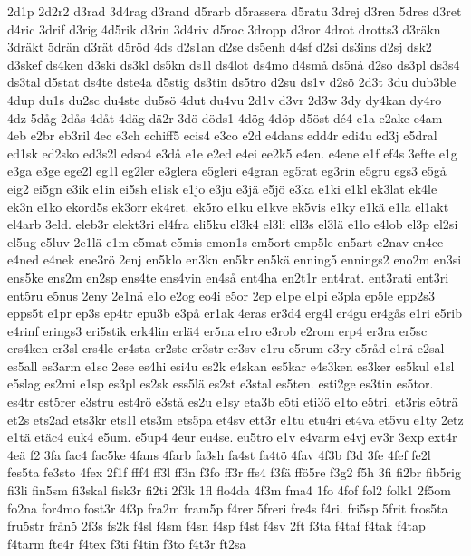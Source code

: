 {2d1p
2d2r2
d3rad
3d4rag
d3rand
d5rarb
d5rassera
d5ratu
3drej
d3ren
5dres
d3ret
d4ric
3drif
d3rig
4d5rik
d3rin
3d4riv
d5roc
3dropp
d3ror
4drot
drotts3
d3r^^e4kn
3dr^^e4kt
5dr^^e4n
d3r^^e4t
d5r^^f6d
4ds
d2s1an
d2se
ds5enh
d4sf
d2si
ds3ins
d2sj
dsk2
d3skef
ds4ken
d3ski
ds3kl
ds5kn
ds1l
ds4lot
ds4mo
d4sm^^e5
ds5n^^e5
d2so
ds3pl
ds3s4
ds3tal
d5stat
ds4te
dste4a
d5stig
ds3tin
ds5tro
d2su
ds1v
d2s^^f6
2d3t
3du
dub3ble
4dup
du1s
du2sc
du4ste
du5s^^f6
4dut
du4vu
2d1v
d3vr
2d3w
3dy
dy4kan
dy4ro
4dz
5d^^e5g
2d^^e5s
4d^^e5t
4d^^e4g
d^^e42r
3d^^f6
d^^f6ds1
4d^^f6g
4d^^f6p
d5^^f6st
d^^e94
e1a
e2ake
e4am
4eb
e2br
eb3ril
4ec
e3ch
echiff5
ecis4
e3co
e2d
e4dans
edd4r
edi4u
ed3j
e5dral
ed1sk
ed2sko
ed3s2l
edso4
e3d^^e5
e1e
e2ed
e4ei
ee2k5
e4en.
e4ene
e1f
ef4s
3efte
e1g
e3ga
e3ge
ege2l
eg1l
eg2ler
e3glera
e5gleri
e4gran
eg5rat
eg3rin
e5gru
egs3
e5g^^e5
eig2
ei5gn
e3ik
e1in
ei5sh
e1isk
e1jo
e3ju
e3j^^e4
e5j^^f6
e3ka
e1ki
e1kl
ek3lat
ek4le
ek3n
e1ko
ekord5s
ek3orr
ek4ret.
ek5ro
e1ku
e1kve
ek5vis
e1ky
e1k^^e4
e1la
el1akt
el4arb
3eld.
eleb3r
elekt3ri
el4fra
eli5ku
el3k4
el3li
ell3s
el3l^^e4
e1lo
e4lob
el3p
el2si
el5ug
e5luv
2e1l^^e4
e1m
e5mat
e5mis
emon1s
em5ort
emp5le
en5art
e2nav
en4ce
e4ned
e4nek
ene3r^^f6
2enj
en5klo
en3kn
en5kr
en5k^^e4
enning5
ennings2
eno2m
en3si
ens5ke
ens2m
en2sp
ens4te
ens4vin
en4s^^e5
ent4ha
en2t1r
ent4rat.
ent3rati
ent3ri
ent5ru
e5nus
2eny
2e1n^^e4
e1o
e2og
eo4i
e5or
2ep
e1pe
e1pi
e3pla
ep5le
epp2s3
epps5t
e1pr
ep3s
ep4tr
epu3b
e3p^^e5
er1ak
4eras
er3d4
erg4l
er4gu
er4g^^e5s
e1ri
e5rib
e4rinf
erings3
eri5stik
erk4lin
erl^^e44
er5na
e1ro
e3rob
e2rom
erp4
er3ra
er5sc
ers4ken
er3sl
ers4le
er4sta
er2ste
er3str
er3sv
e1ru
e5rum
e3ry
e5r^^e5d
e1r^^e4
e2sal
es5all
es3arm
e1sc
2ese
es4hi
esi4u
es2k
e4skan
es5kar
e4s3ken
es3ker
es5kul
e1sl
e5slag
es2mi
e1sp
es3pl
es2sk
ess5l^^e4
es2st
e3stal
es5ten.
esti2ge
es3tin
es5tor.
es4tr
est5rer
e3stru
est4r^^f6
e3st^^e5
es2u
e1sy
eta3b
e5ti
eti3^^f6
e1to
e5tri.
et3ris
e5tr^^e4
et2s
ets2ad
ets3kr
ets1l
ets3m
ets5pa
et4sv
ett3r
e1tu
etu4ri
et4va
et5vu
e1ty
2etz
e1t^^e4
et^^e4c4
euk4
e5um.
e5up4
4eur
eu4se.
eu5tro
e1v
e4varm
e4vj
ev3r
3exp
ext4r
4e^^e4
f2
3fa
fac4
fac5ke
4fans
4farb
fa3sh
fa4st
fa4t^^f6
4fav
4f3b
f3d
3fe
4fef
fe2l
fes5ta
fe3sto
4fex
2f1f
fff4
ff3l
ff3n
f3fo
ff3r
ffs4
f3f^^e4
ff^^f65re
f3g2
f5h
3fi
fi2br
fib5rig
fi3li
fin5sm
fi3skal
fisk3r
fi2ti
2f3k
1fl
flo4da
4f3m
fma4
1fo
4fof
fol2
folk1
2f5om
fo2na
for4mo
fost3r
4f3p
fra2m
fram5p
f4rer
5freri
fre4s
f4ri.
fri5sp
5frit
fros5ta
fru5str
fr^^e5n5
2f3s
fs2k
f4sl
f4sm
f4sn
f4sp
f4st
f4sv
2ft
f3ta
f4taf
f4tak
f4tap
f4tarm
fte4r
f4tex
f3ti
f4tin
f3to
f4t3r
ft2sa
}
